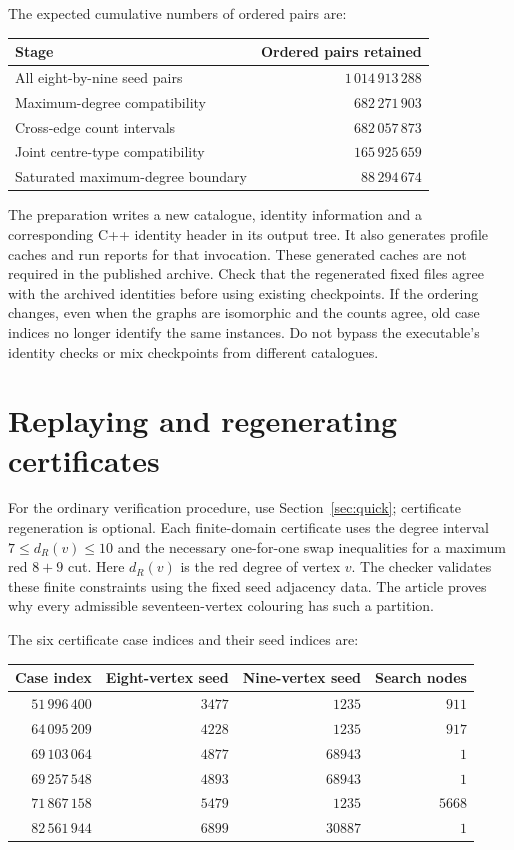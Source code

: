 \documentclass[11pt]{article}
\begin{document}
The expected cumulative numbers of ordered pairs are:
\begin{center}
\begin{tabular}{@{}lr@{}}
\toprule
Stage & Ordered pairs retained \\
\midrule
All eight-by-nine seed pairs & $1\,014\,913\,288$ \\
Maximum-degree compatibility & $682\,271\,903$ \\
Cross-edge count intervals & $682\,057\,873$ \\
Joint centre-type compatibility & $165\,925\,659$ \\
Saturated maximum-degree boundary & $88\,294\,674$ \\
\bottomrule
\end{tabular}
\end{center}

The preparation writes a new catalogue, identity information and a
corresponding C++ identity header in its output tree. It also generates
profile caches and run reports for that invocation. These generated
caches are not required in the published archive. Check that the
regenerated fixed files agree with the archived identities before
using existing checkpoints. If the ordering changes, even when the
graphs are isomorphic and the counts agree, old case indices no longer
identify the same instances. Do not bypass the executable's identity
checks or mix checkpoints from different catalogues.

\section{Replaying and regenerating certificates}

For the ordinary verification procedure, use Section~\ref{sec:quick};
certificate regeneration is optional. Each finite-domain certificate
uses the degree interval $7\leq d_R(v)\leq10$ and the necessary
one-for-one swap inequalities for a maximum red $8+9$ cut. Here
$d_R(v)$ is the red degree of vertex $v$. The checker validates these
finite constraints using the fixed seed adjacency data. The article
proves why every admissible seventeen-vertex colouring has such a
partition.

The six certificate case indices and their seed indices are:
\begin{center}
\begin{tabular}{@{}rrrr@{}}
\toprule
Case index & Eight-vertex seed & Nine-vertex seed & Search nodes \\
\midrule
$51\,996\,400$ & $3477$ & $1235$ & $911$ \\
$64\,095\,209$ & $4228$ & $1235$ & $917$ \\
$69\,103\,064$ & $4877$ & $68943$ & $1$ \\
$69\,257\,548$ & $4893$ & $68943$ & $1$ \\
$71\,867\,158$ & $5479$ & $1235$ & $5668$ \\
$82\,561\,944$ & $6899$ & $30887$ & $1$ \\
\bottomrule
\end{tabular}
\end{center}
\end{document}
